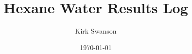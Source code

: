 \documentclass[12pt,reqno]{amsart}
\numberwithin{equation}{section}
\begin{document}
\title{Hexane Water Results Log}
\author{Kirk Swanson}
\address{Institute for Molecular Engineering, University of Chicago, 5640 S Ellis Ave, Chicago, IL 60637}
\date{\today}




\maketitle


\normalsize

\end{document}
